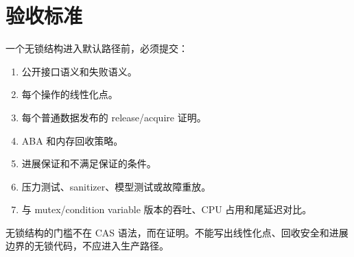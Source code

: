 \section{验收标准}

一个无锁结构进入默认路径前，必须提交：

\begin{enumerate}
  \item 公开接口语义和失败语义。
  \item 每个操作的线性化点。
  \item 每个普通数据发布的 release/acquire 证明。
  \item ABA 和内存回收策略。
  \item 进展保证和不满足保证的条件。
  \item 压力测试、sanitizer、模型测试或故障重放。
  \item 与 mutex/condition variable 版本的吞吐、CPU 占用和尾延迟对比。
\end{enumerate}

\begin{keyidea}
无锁结构的门槛不在 CAS 语法，而在证明。不能写出线性化点、回收安全和进展边界的无锁代码，不应进入生产路径。
\end{keyidea}

